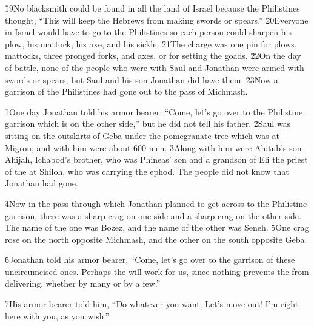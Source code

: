 \v{19}No blacksmith could be found in all the land of Israel because the Philistines thought, ``This will keep the Hebrews from making swords or spears.'' \v{20}Everyone in Israel would have to go to the Philistines so each person could sharpen his plow, his mattock, his axe, and his sickle. \v{21}The charge was one pin for plows, mattocks, three pronged forks, and axes, or for setting the goads. \v{22}On the day of battle, none of the people who were with Saul and Jonathan were armed with swords or spears, but Saul and his son Jonathan did have them. \v{23}Now a garrison of the Philistines had gone out to the pass of Michmash.

\v{1}One day Jonathan told his armor bearer, ``Come, let's go over to the Philistine garrison which is on the other side,'' but he did not tell his father. \v{2}Saul was sitting on the outskirts of Geba under the pomegranate tree which was at Migron, and with him were about 600 men. \v{3}Along with him were Ahitub's son Ahijah, Ichabod's brother, who was Phineas' son and a grandson of Eli the priest of the  at Shiloh, who was carrying the ephod. The people did not know that Jonathan had gone.

\v{4}Now in the pass through which Jonathan planned to get across to the Philistine garrison, there was a sharp crag on one side and a sharp crag on the other side. The name of the one was Bozez, and the name of the other was Seneh. \v{5}One crag rose on the north opposite Michmash, and the other on the south opposite Geba.

\v{6}Jonathan told his armor bearer, ``Come, let's go over to the garrison of these uncircumcised ones. Perhaps the  will work for us, since nothing prevents the  from delivering, whether by many or by a few.''

\v{7}His armor bearer told him, ``Do whatever you want. Let's move out! I'm right here with you, as you wish.''

